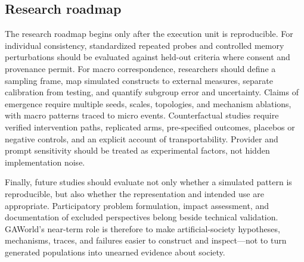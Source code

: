 \subsection{Research roadmap}

The research roadmap begins only after the execution unit is reproducible.
For individual consistency, standardized repeated probes and controlled memory
perturbations should be evaluated against held-out criteria where consent and
provenance permit.  For macro correspondence, researchers should define a
sampling frame, map simulated constructs to external measures, separate
calibration from testing, and quantify subgroup error and uncertainty.  Claims
of emergence require multiple seeds, scales, topologies, and mechanism
ablations, with macro patterns traced to micro events.  Counterfactual studies
require verified intervention paths, replicated arms, pre-specified outcomes,
placebos or negative controls, and an explicit account of transportability.
Provider and prompt sensitivity should be treated as experimental factors, not
hidden implementation noise.

Finally, future studies should evaluate not only whether a simulated pattern
is reproducible, but also whether the representation and intended use are
appropriate.  Participatory problem formulation, impact assessment, and
documentation of excluded perspectives belong beside technical validation.
GAWorld's near-term role is therefore to make artificial-society hypotheses,
mechanisms, traces, and failures easier to construct and inspect---not to turn
generated populations into unearned evidence about society.
